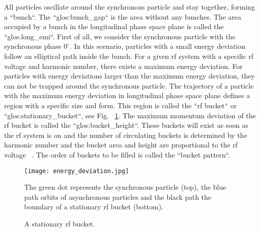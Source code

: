 All particles oscillate around the synchronous particle and stay together, forming a ``bunch``. The ``\gls{glos:bunch_gap}`` is the area without any bunches. The area occupied by a bunch in the longitudinal phase space plane is called the ``\gls{glos:long_emi}``. First of all, we consider the synchronous particle with the synchronous phase $0^\circ$. In this scenario, particles with a small energy deviation follow an elliptical path inside the bunch. For a given rf system with a specific rf voltage and harmonic number, there exists a maximum energy deviation. For particles with energy deviations larger than the maximum energy deviation, they can not be trapped around the synchronous particle. The trajectory of a particle with the maximum energy deviation in longitudinal phase space plane defines a region with a specific size and form. This region is called the ``rf bucket`` or ``\gls{glos:stationary_bucket}``, see Fig. ~\ref{energy_deviation}. The maximum momentum deviation of the rf bucket is called the ``\gls{glos:bucket_height}``. These buckets will exist as soon as the rf system is on and the number of circulating buckets is determined by the harmonic number and the bucket area and height are proportional to the rf voltage ~\cite{lee_accelerator_2011}. The order of buckets to be filled is called the ``bucket pattern``.
\begin{figure}[!htb]
   \centering   
   \texttt{[image: energy\_deviation.jpg]}
   \caption{A stationary rf bucket.}{The green dot represents the synchronous particle (top), the blue path orbits of asynchronous particles and the black path the boundary of a stationary rf bucket (bottom).}
   \label{energy_deviation}
\end{figure} 

